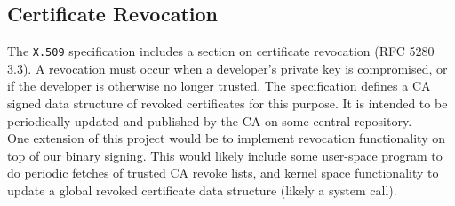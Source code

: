 \documentclass[12pt, letterpaper]{report}
\begin{document}
	\subsection{Certificate Revocation}
		The \texttt{X.509} specification includes a section on certificate revocation (RFC 5280 3.3). A revocation must occur when a developer's private key is compromised, or if the developer is otherwise no longer trusted. The specification defines a CA signed data structure of revoked certificates for this purpose. It is intended to be periodically updated and published by the CA on some central repository. \\
		
One extension of this project would be to implement revocation functionality on top of our binary signing. This would likely include some user-space program to do periodic fetches of trusted CA revoke lists, and kernel space functionality to update a global revoked certificate data structure (likely a system call). 
\end{document}
